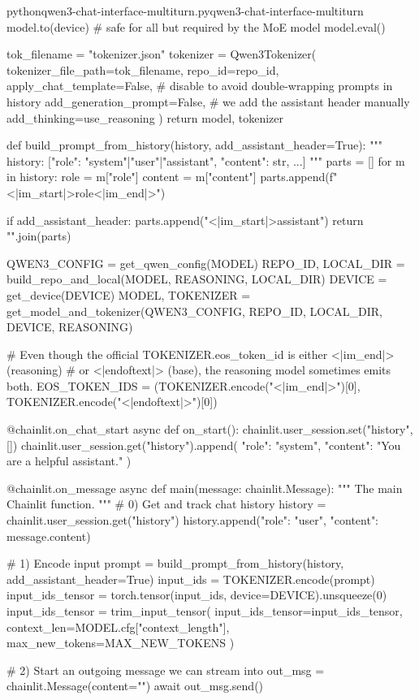 \documentclass[lang=cn,newtx,10pt,scheme=chinese]{elegantbook}
\begin{document}
\begin{codebox}{python}{qwen3-chat-interface-multiturn.py}{qwen3-chat-interface-multiturn}
    model.to(device)  # safe for all but required by the MoE model
    model.eval()

    tok_filename = "tokenizer.json"
    tokenizer = Qwen3Tokenizer(
        tokenizer_file_path=tok_filename,
        repo_id=repo_id,
        apply_chat_template=False,    # disable to avoid double-wrapping prompts in history
        add_generation_prompt=False,  # we add the assistant header manually
        add_thinking=use_reasoning
    )
    return model, tokenizer


def build_prompt_from_history(history, add_assistant_header=True):
    """
    history: [{"role": "system"|"user"|"assistant", "content": str}, ...]
    """
    parts = []
    for m in history:
        role = m["role"]
        content = m["content"]
        parts.append(f"<|im_start|>{role}<|im_end|>\n")

    if add_assistant_header:
        parts.append("<|im_start|>assistant\n")
    return "".join(parts)


QWEN3_CONFIG = get_qwen_config(MODEL)
REPO_ID, LOCAL_DIR = build_repo_and_local(MODEL, REASONING, LOCAL_DIR)
DEVICE = get_device(DEVICE)
MODEL, TOKENIZER = get_model_and_tokenizer(QWEN3_CONFIG, REPO_ID, LOCAL_DIR, DEVICE, REASONING)

# Even though the official TOKENIZER.eos_token_id is either <|im_end|> (reasoning)
# or <|endoftext|> (base), the reasoning model sometimes emits both.
EOS_TOKEN_IDS = (TOKENIZER.encode("<|im_end|>")[0], TOKENIZER.encode("<|endoftext|>")[0])


@chainlit.on_chat_start
async def on_start():
    chainlit.user_session.set("history", [])
    chainlit.user_session.get("history").append(
        {"role": "system", "content": "You are a helpful assistant."}
    )


@chainlit.on_message
async def main(message: chainlit.Message):
    """
    The main Chainlit function.
    """
    # 0) Get and track chat history
    history = chainlit.user_session.get("history")
    history.append({"role": "user", "content": message.content})

    # 1) Encode input
    prompt = build_prompt_from_history(history, add_assistant_header=True)
    input_ids = TOKENIZER.encode(prompt)
    input_ids_tensor = torch.tensor(input_ids, device=DEVICE).unsqueeze(0)
    input_ids_tensor = trim_input_tensor(
        input_ids_tensor=input_ids_tensor,
        context_len=MODEL.cfg["context_length"],
        max_new_tokens=MAX_NEW_TOKENS
    )

    # 2) Start an outgoing message we can stream into
    out_msg = chainlit.Message(content="")
    await out_msg.send()


\end{codebox}
\end{document}
